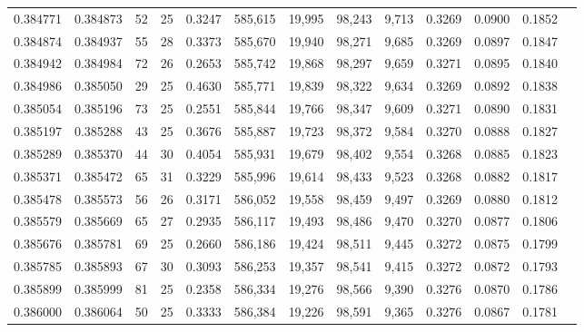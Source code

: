 \begin{tabular}{rrrrrrrrrrrrr}
0.384771 & 0.384873 &    52 &  25 &                                     0.3247 & 585,615 &  19,995 &  98,243 &   9,713 & 0.3269 & 0.0900 & 0.1852 \\
0.384874 & 0.384937 &    55 &  28 &                                     0.3373 & 585,670 &  19,940 &  98,271 &   9,685 & 0.3269 & 0.0897 & 0.1847 \\
0.384942 & 0.384984 &    72 &  26 &                                     0.2653 & 585,742 &  19,868 &  98,297 &   9,659 & 0.3271 & 0.0895 & 0.1840 \\
0.384986 & 0.385050 &    29 &  25 &                                     0.4630 & 585,771 &  19,839 &  98,322 &   9,634 & 0.3269 & 0.0892 & 0.1838 \\
0.385054 & 0.385196 &    73 &  25 &                                     0.2551 & 585,844 &  19,766 &  98,347 &   9,609 & 0.3271 & 0.0890 & 0.1831 \\
0.385197 & 0.385288 &    43 &  25 &                                     0.3676 & 585,887 &  19,723 &  98,372 &   9,584 & 0.3270 & 0.0888 & 0.1827 \\
0.385289 & 0.385370 &    44 &  30 &                                     0.4054 & 585,931 &  19,679 &  98,402 &   9,554 & 0.3268 & 0.0885 & 0.1823 \\
0.385371 & 0.385472 &    65 &  31 &                                     0.3229 & 585,996 &  19,614 &  98,433 &   9,523 & 0.3268 & 0.0882 & 0.1817 \\
0.385478 & 0.385573 &    56 &  26 &                                     0.3171 & 586,052 &  19,558 &  98,459 &   9,497 & 0.3269 & 0.0880 & 0.1812 \\
0.385579 & 0.385669 &    65 &  27 &                                     0.2935 & 586,117 &  19,493 &  98,486 &   9,470 & 0.3270 & 0.0877 & 0.1806 \\
0.385676 & 0.385781 &    69 &  25 &                                     0.2660 & 586,186 &  19,424 &  98,511 &   9,445 & 0.3272 & 0.0875 & 0.1799 \\
0.385785 & 0.385893 &    67 &  30 &                                     0.3093 & 586,253 &  19,357 &  98,541 &   9,415 & 0.3272 & 0.0872 & 0.1793 \\
0.385899 & 0.385999 &    81 &  25 &                                     0.2358 & 586,334 &  19,276 &  98,566 &   9,390 & 0.3276 & 0.0870 & 0.1786 \\
0.386000 & 0.386064 &    50 &  25 &                                     0.3333 & 586,384 &  19,226 &  98,591 &   9,365 & 0.3276 & 0.0867 & 0.1781 \\

\end{tabular}
